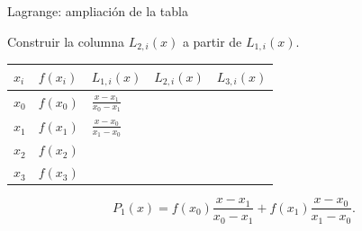 \documentclass[original_version/main.tex]{subfiles}
\begin{document}
\begin{frame}[t]{Lagrange: ampliación de la tabla}
\par\noindent\begin{minipage}[t][10mm][t]{\textwidth}\small\strut Construir la columna $L_{2,i}(x)$ a partir de $L_{1,i}(x)$.\end{minipage}\par\nointerlineskip
\begin{minipage}[t]{\textwidth}\begingroup\scriptsize\setlength{\tabcolsep}{3pt}\begin{center}\begin{tabular}{|C{.065\textwidth}|C{.095\textwidth}|C{.19\textwidth}|C{.25\textwidth}|C{.25\textwidth}|}\hline
\rule[-2mm]{0pt}{6mm}$x_i$&$f(x_i)$&$L_{1,i}(x)$&$L_{2,i}(x)$&$L_{3,i}(x)$\\\hline
\rule[-2.5mm]{0pt}{8mm}$x_0$&$f(x_0)$&$\frac{x-x_1}{x_0-x_1}$&&\\\hline
\rule[-2.5mm]{0pt}{8mm}$x_1$&$f(x_1)$&$\frac{x-x_0}{x_1-x_0}$&&\\\hline
\rule[-2.5mm]{0pt}{8mm}$x_2$&$f(x_2)$&&&\\\hline
\rule[-2.5mm]{0pt}{8mm}$x_3$&$f(x_3)$&&&\\\hline
\end{tabular}\end{center}\endgroup\par
\end{minipage}\par\[P_1(x)=f(x_0)\frac{x-x_1}{x_0-x_1}+f(x_1)\frac{x-x_0}{x_1-x_0}.\]
\end{frame}
\end{document}
